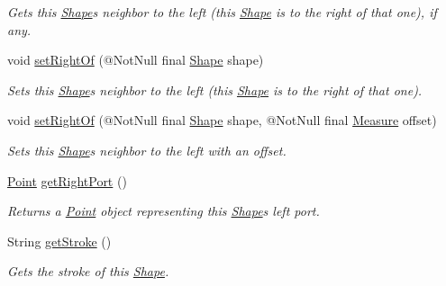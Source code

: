 \begin{DoxyCompactItemize}
\begin{DoxyCompactList}\small\item\em Gets this \hyperlink{classcom_1_1aarrelaakso_1_1drawl_1_1_shape}{Shape}\textquotesingle{}s neighbor to the left (this \hyperlink{classcom_1_1aarrelaakso_1_1drawl_1_1_shape}{Shape} is to the right of that one), if any. \end{DoxyCompactList}\item 
void \hyperlink{classcom_1_1aarrelaakso_1_1drawl_1_1_shape_a3cada5e03bd1552a79702d2945c7ed01}{set\+Right\+Of} (@Not\+Null final \hyperlink{classcom_1_1aarrelaakso_1_1drawl_1_1_shape}{Shape} shape)
\begin{DoxyCompactList}\small\item\em Sets this \hyperlink{classcom_1_1aarrelaakso_1_1drawl_1_1_shape}{Shape}\textquotesingle{}s neighbor to the left (this \hyperlink{classcom_1_1aarrelaakso_1_1drawl_1_1_shape}{Shape} is to the right of that one). \end{DoxyCompactList}\item 
void \hyperlink{classcom_1_1aarrelaakso_1_1drawl_1_1_shape_a89e85848d24dca0fa60ff68d169eef11}{set\+Right\+Of} (@Not\+Null final \hyperlink{classcom_1_1aarrelaakso_1_1drawl_1_1_shape}{Shape} shape, @Not\+Null final \hyperlink{classcom_1_1aarrelaakso_1_1drawl_1_1_measure}{Measure} offset)
\begin{DoxyCompactList}\small\item\em Sets this \hyperlink{classcom_1_1aarrelaakso_1_1drawl_1_1_shape}{Shape}\textquotesingle{}s neighbor to the left with an offset. \end{DoxyCompactList}\item 
\hyperlink{classcom_1_1aarrelaakso_1_1drawl_1_1_point}{Point} \hyperlink{classcom_1_1aarrelaakso_1_1drawl_1_1_shape_a319c78d425ec91e1aef1072a95e349ad}{get\+Right\+Port} ()
\begin{DoxyCompactList}\small\item\em Returns a \hyperlink{classcom_1_1aarrelaakso_1_1drawl_1_1_point}{Point} object representing this \hyperlink{classcom_1_1aarrelaakso_1_1drawl_1_1_shape}{Shape}\textquotesingle{}s left port. \end{DoxyCompactList}\item 
String \hyperlink{classcom_1_1aarrelaakso_1_1drawl_1_1_shape_a4e1d54c7e161e3af5053939ddefdf9e6}{get\+Stroke} ()
\begin{DoxyCompactList}\small\item\em Gets the stroke of this \hyperlink{classcom_1_1aarrelaakso_1_1drawl_1_1_shape}{Shape}. \end{DoxyCompactList}\item 

\end{DoxyCompactItemize}
